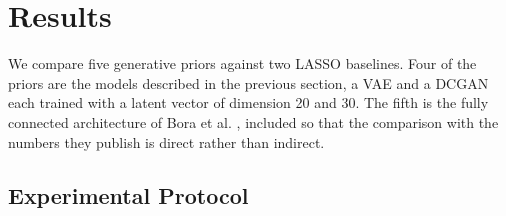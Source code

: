 \section{Results}
\vspace{1cm}
We compare five generative priors against two LASSO baselines. Four of the priors are the models described in the previous section, a VAE and a DCGAN each trained with a latent vector of dimension 20 and 30. The fifth is the fully connected architecture of Bora et al. \cite{bora2017}, included so that the comparison with the numbers they publish is direct rather than indirect.

\subsection{Experimental Protocol}

